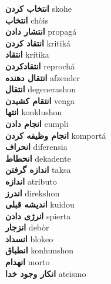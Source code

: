 \textbf{ انتخاب کردن  } skohe \\
\textbf{ انتخاب  } chòis \\
\textbf{ انتشار دادن  } propagá \\
\textbf{ انتقاد کردن  } kritiká \\
\textbf{ انتقاد  } krítika \\
\textbf{ انتقادکردن  } reprochá \\
\textbf{ انتقال دهنده  } afzender \\
\textbf{ انتقال  } degenerashon \\
\textbf{ انتقام کشیدن  } venga \\
\textbf{ انتها  } konklushon \\
\textbf{ انجام دادن  } cumpli \\
\textbf{ انجام وظیفه کردن  } komportá \\
\textbf{ انحراف  } diferensia \\
\textbf{ انحطاط  } dekadente \\
\textbf{ اندازه گرفتن  } taksa \\
\textbf{ اندازه  } atributo \\
\textbf{ اندرز  } direkshon \\
\textbf{ اندیشه قبلی  } kuidou \\
\textbf{ انرژی دادن  } spierta \\
\textbf{ انزجار  } debòr \\
\textbf{ انسداد  } blokeo \\
\textbf{ انطباق  } konhunshon \\
\textbf{ انهدام  } morto \\
\textbf{ انکار وجود خدا  } ateismo \\
